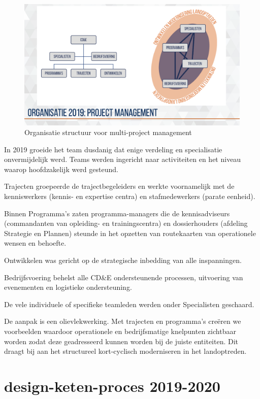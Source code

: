 \documentclass[
]{book}
\begin{document}
\begin{figure}

{\centering \includegraphics[width=0.5\linewidth]{data/keynote-slides/20200430-CDE-Designprocess/20200430-CDE-Designprocess.009-2} 

}

\caption{Organisatie structuur voor multi-project management }\label{fig:unnamed-chunk-22}
\end{figure}

In 2019 groeide het team dusdanig dat enige verdeling en specialisatie onvermijdelijk werd. Teams werden ingericht naar activiteiten en het niveau waarop hoofdzakelijk werd gesteund.

Trajecten groepeerde de trajectbegeleiders en werkte voornamelijk met de kenniswerkers (kennis- en expertise centra) en stafmedewerkers (parate eenheid).

Binnen Programma's zaten programma-managers die de kennisadviseurs (commandanten van opleiding- en trainingscentra) en dossierhouders (afdeling Strategie en Plannen) steunde in het opzetten van routekaarten van operationele wensen en behoefte.

Ontwikkelen was gericht op de strategische inbedding van alle inspanningen.

Bedrijfsvoering behelst alle CD\&E ondersteunende processen, uitvoering van evenementen en logistieke ondersteuning.

De vele individuele of specifieke teamleden werden onder Specialisten geschaard.

De aanpak is een olievlekwerking. Met trajecten en programma's creëren we voorbeelden waardoor operationele en bedrijfsmatige knelpunten zichtbaar worden zodat deze geadresseerd kunnen worden bij de juiste entiteiten. Dit draagt bij aan het structureel kort-cyclisch moderniseren in het landoptreden.

\hypertarget{design-keten-proces-2019-2020}{%
\section{design-keten-proces 2019-2020}\label{design-keten-proces-2019-2020}}
\end{document}
